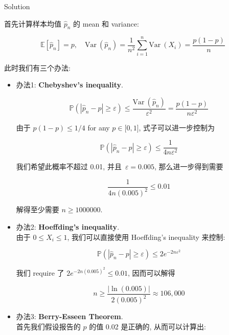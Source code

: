 \begin{qlsolution}{Solution}

首先计算样本均值 \({\widehat{\mathit{p}}}_{\mathit{n}}\) 的 mean 和 variance:

\[\mathbb{E}\left\lbrack {\widehat{\mathit{p}}}_{\mathit{n}} \right\rbrack = \mathit{p},\quad\text{Var}\ \left( {\widehat{\mathit{p}}}_{\mathit{n}} \right) = \frac{1}{\mathit{n}^{2}}\sum\limits_{\mathit{i} = 1}^{\mathit{n}}\text{Var}\ \left( \mathit{X}_{\mathit{i}} \right) = \frac{\mathit{p}(1 - \mathit{p})}{\mathit{n}}\]

此时我们有三个办法:

\begin{itemize}
\item
  办法1: \textbf{Chebyshev's inequality}.

  \[\mathbb{P}\left( {\left| {{\widehat{\mathit{p}}}_{\mathit{n}} - \mathit{p}} \right| \geq \mathit{\varepsilon}} \right) \leq \frac{\text{Var}\ \left( {\widehat{\mathit{p}}}_{\mathit{n}} \right)}{\mathit{\varepsilon}^{2}} = \frac{\mathit{p}(1 - \mathit{p})}{\mathit{n}\mathit{\varepsilon}^{2}}\]

  由于 \(\mathit{p}(1 - \mathit{p}) \leq 1/4\) for any \(\mathit{p} \in \lbrack 0,1\rbrack\), 式子可以进一步控制为

  \[\mathbb{P}\left( {\left| {{\widehat{\mathit{p}}}_{\mathit{n}} - \mathit{p}} \right| \geq \mathit{\varepsilon}} \right) \leq \frac{1}{4\mathit{n}\mathit{\varepsilon}^{2}}\]

  我们希望此概率不超过 0.01, 并且~\(\mathit{\varepsilon} = 0.005\), 那么进一步得到需要

  \[\frac{1}{4\mathit{n}(0.005)^{2}} \leq 0.01\]

  解得至少需要 \(\mathit{n} \geq 1000000\).
\item
  办法2: \textbf{Hoeffding's inequality}.\\
  由于 \(0 \leq \mathit{X}_{\mathit{i}} \leq 1\), 我们可以直接使用 Hoeffding's inequality 来控制:

  \[\mathbb{P}\left( {\left| {{\widehat{\mathit{p}}}_{\mathit{n}} - \mathit{p}} \right| \geq \mathit{\varepsilon}} \right) \leq 2\mathit{e}^{- 2\mathit{n}\mathit{\varepsilon}^{2}}\]

  我们 require 了 \(2\mathit{e}^{- 2\mathit{n}(0.005)^{2}} \leq 0.01\), 因而可以解得

  \[\mathit{n} \geq \frac{|\ln(0.005)|}{2(0.005)^{2}} \approx 106,000\]
\item
  办法3: \textbf{Berry-Esseen Theorem}.\\
  首先我们假设报告的 \(\mathit{p}\) 的值 0.02 是正确的, 从而可以计算出:


\end{itemize}
\end{qlsolution}
